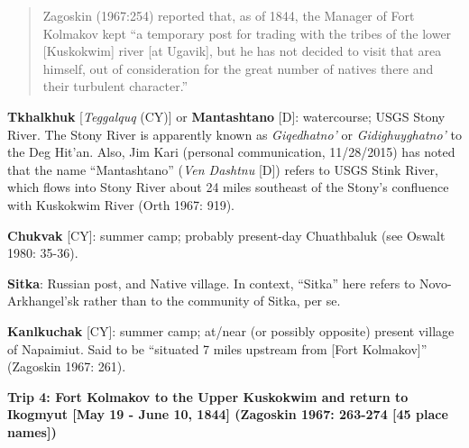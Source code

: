 \begin{hang}
\begin{quote}Zagoskin (1967:254) reported that, as of 1844, the Manager of Fort Kolmakov kept “a temporary post for trading with the tribes of the lower [Kuskokwim] river [at Ugavik], but he has not decided to visit that area himself, out of consideration for the great number of natives there and their turbulent character.”
\end{quote}



\textbf{Tkhalkhuk} [\textit{Teggalquq} (CY)] or \textbf{Mantashtano} [D]: watercourse; USGS Stony River. The Stony River is apparently known as \textit{Giqedhatno’} or \textit{Gidighuyghatno’} to the Deg Hit’an. Also, Jim Kari (personal communication, 11/28/2015) has noted that the name “Mantashtano” (\textit{Ven Dashtnu} [D]) refers to USGS Stink River, which flows into Stony River about 24 miles southeast of the Stony’s confluence with Kuskokwim River (Orth 1967: 919).



\textbf{Chukvak} [CY]: summer camp; probably present-day Chuathbaluk (see Oswalt 1980: 35-36).



\textbf{Sitka}: Russian post, and Native village. In context, “Sitka” here refers to Novo-Arkhangel’sk rather than to the community of Sitka, per se.



\textbf{Kanlkuchak} [CY]: summer camp; at/near (or possibly opposite) present village of Napaimiut. Said to be “situated 7 miles upstream from [Fort Kolmakov]” (Zagoskin 1967: 261).

\end{hang}

\vspace{1cm}
\noindent
\textbf{Trip 4: Fort Kolmakov to the Upper Kuskokwim and return to Ikogmyut [May 19 - June 10, 1844] (Zagoskin 1967: 263-274 [45 place names])}
\vspace{6pt}


